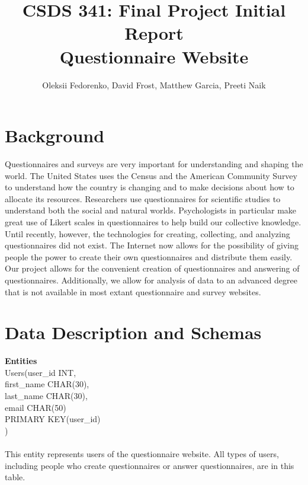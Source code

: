 \documentclass[12pt, oneside, a4paper]{article}
\title{CSDS 341: Final Project Initial Report\\ Questionnaire Website}
\author{Oleksii Fedorenko, David Frost, Matthew Garcia, Preeti Naik}
\begin{document}
    \maketitle
    \section{Background}
    Questionnaires and surveys are very important for understanding and shaping the world. The United States uses the Census and the
    American Community Survey to understand how the country is changing and to make decisions about how to allocate its
    resources. Researchers use questionnaires for scientific studies to understand both the social and natural worlds.
    Psychologists in particular make great use of Likert scales in questionnaires to help build our collective knowledge.
    Until recently, however, the technologies for creating, collecting, and analyzing questionnaires did not exist.
    The Internet now allows for the possibility of giving people the power to create their own questionnaires and distribute
    them easily. Our project allows for the convenient creation of questionnaires and answering of questionnaires. Additionally,
    we allow for analysis of data to an advanced degree that is not available in most extant questionnaire and survey websites.
    \section{Data Description and Schemas}
    \textbf{Entities}
    \\
    Users(user\_id       INT,\\
          first\_name    CHAR(30),\\
          last\_name     CHAR(30),\\
          email         CHAR(50)\\
          PRIMARY KEY(user\_id)\\
    )
    \\
    \\
    This entity represents users of the questionnaire website.
    All types of users, including people who create questionnaires
    or answer questionnaires, are in this table.
\end{document}
